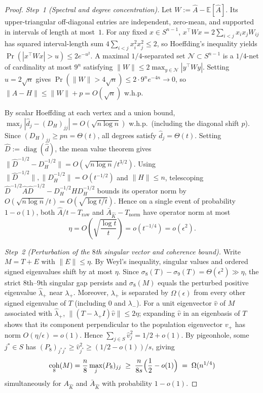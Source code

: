 \documentclass[11pt]{article}
\theoremstyle{plain}
\theoremstyle{definition}
\theoremstyle{remark}
\DeclareMathOperator{\coh}{coh}
\DeclareMathOperator{\diag}{diag}
\begin{document}
\begin{proof}
\emph{Step~1 (Spectral and degree concentration).}
Let $W := \hat{A} - \mathbb{E}[\hat{A}]$. Its upper-triangular off-diagonal entries are independent, zero-mean, and supported in intervals of length at most~$1$. For any fixed $x \in S^{n-1}$, $x^\top W x = 2\sum_{i<j} x_i x_j W_{ij}$ has squared interval-length sum $4\sum_{i<j} x_i^2 x_j^2 \le 2$, so Hoeffding's inequality yields $\Pr(|x^\top W x| > u) \le 2e^{-u^2}$. A maximal $1/4$-separated set $\mathcal{N} \subset S^{n-1}$ is a $1/4$-net of cardinality at most $9^n$ satisfying $\|W\| \le 2\max_{y \in \mathcal{N}}|y^\top W y|$. Setting $u = 2\sqrt{n}$ gives $\Pr(\|W\| > 4\sqrt{n}) \le 2\cdot 9^n e^{-4n} \to 0$, so $\|\hat{A} - H\| \le \|W\| + p = O(\sqrt{n})$ w.h.p.

By scalar Hoeffding at each vertex and a union bound, $\max_j |\hat{d}_j - (D_H)_{jj}| = O(\sqrt{n\log n})$ w.h.p.\ (including the diagonal shift $p$). Since $(D_H)_{jj} \ge pn = \Theta(t)$, all degrees satisfy $\hat{d}_j = \Theta(t)$. Setting $\hat{D} := \diag(\hat{d})$, the mean value theorem gives $\|\hat{D}^{-1/2} - D_H^{-1/2}\| = O(\sqrt{n\log n}/t^{3/2})$. Using $\|\hat{D}^{-1/2}\|, \|D_H^{-1/2}\| = O(t^{-1/2})$ and $\|H\| \le n$, telescoping $\hat{D}^{-1/2}\hat{A}\hat{D}^{-1/2} - D_H^{-1/2} H D_H^{-1/2}$ bounds its operator norm by $O(\sqrt{n\log n}/t) = O(\sqrt{\log t/t})$. Hence on a single event of probability $1 - o(1)$, both $\hat{A}/t - T_{\mathrm{raw}}$ and $\bar{A}_{\hat{K}} - T_{\mathrm{norm}}$ have operator norm at most
\[
\eta = O\!\left(\sqrt{\frac{\log t}{t}}\right) = o(t^{-1/4}) = o(\epsilon^2).
\]

\emph{Step~2 (Perturbation of the $8$th singular vector and coherence bound).}
Write $M = T + E$ with $\|E\| \le \eta$. By Weyl's inequality, singular values and ordered signed eigenvalues shift by at most $\eta$. Since $\sigma_8(T) - \sigma_9(T) = \Theta(\epsilon^2) \gg \eta$, the strict $8$th--$9$th singular gap persists and $\sigma_8(M)$ equals the perturbed positive eigenvalue $\hat{\lambda}_+$ near $\lambda_+$. Moreover, $\lambda_+$ is separated by $\Omega(\epsilon)$ from every other signed eigenvalue of $T$ (including $0$ and $\lambda_-$). For a unit eigenvector $\hat{v}$ of $M$ associated with $\hat{\lambda}_+$, $\|(T - \lambda_+ I)\hat{v}\| \le 2\eta$; expanding $\hat{v}$ in an eigenbasis of $T$ shows that its component perpendicular to the population eigenvector $v_+$ has norm $O(\eta/\epsilon) = o(1)$. Hence $\sum_{j \in S} \hat{v}_j^2 = 1/2 + o(1)$. By pigeonhole, some $j^* \in S$ has $(P_8)_{j^* j^*} \ge \hat{v}_{j^*}^2 \ge (1/2 - o(1))/s$, giving
\[
\coh_8(M) = \frac{n}{8}\max_j (P_8)_{jj} \;\ge\; \frac{n}{8s}\Bigl(\frac{1}{2} - o(1)\Bigr) \;=\; \Omega(n^{1/4})
\]
simultaneously for $A_{\hat{K}}$ and $\bar{A}_{\hat{K}}$ with probability $1 - o(1)$.
\end{proof}
\end{document}
